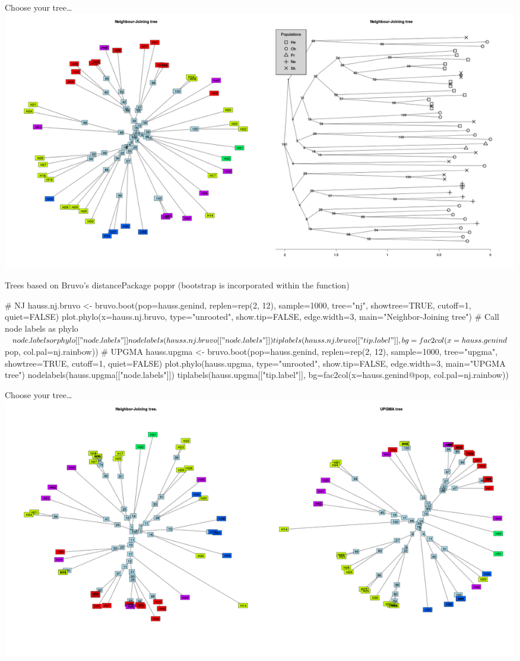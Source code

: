 \documentclass[compress, ucs, xelatex, 11pt, xcolor=svgnames,
  hyperref={
    bookmarks=true,
    unicode=true,
    colorlinks=true,
    pdftitle={Molecular data in R},
    plainpages=false,
    pdfauthor={Vojtech Zeisek},
    pdfsubject={Course about phylogeny and evolution in R},
    pdfcreator={XeLaTeX},
    pdfkeywords={R, evolution, phylogeny, molecular data},
    linkcolor=Tomato,
    anchorcolor=SaddleBrown,
    citecolor=Goldenrod,
    filecolor=DarkMagenta,
    menucolor=Sienna,
    urlcolor=DarkTurquoise,
    pdftex},
  url={hyphens, lowtilde} %
  ]{beamer}
\begin{document}
\begin{frame}{Choose your tree\ldots}
  \includegraphics[width=\textwidth]{nj2.png}
\end{frame}

\begin{frame}[fragile]{Trees based on Bruvo's distance}{Package poppr (bootstrap is incorporated within the function)}
  \begin{spluscode}
    # NJ
    hauss.nj.bruvo <- bruvo.boot(pop=hauss.genind, replen=rep(2, 12),
      sample=1000, tree="nj", showtree=TRUE, cutoff=1, quiet=FALSE)
    plot.phylo(x=hauss.nj.bruvo, type="unrooted", show.tip=FALSE,
      edge.width=3, main="Neighbor-Joining tree")
    # Call node labels as phylo$node.labels or phylo[["node.labels"]]
    nodelabels(hauss.nj.bruvo[["node.labels"]]) 
    tiplabels(hauss.nj.bruvo[["tip.label"]], bg=fac2col(x=hauss.genind$pop,
      col.pal=nj.rainbow))
    # UPGMA
    hauss.upgma <- bruvo.boot(pop=hauss.genind, replen=rep(2, 12),
      sample=1000, tree="upgma", showtree=TRUE, cutoff=1, quiet=FALSE)
    plot.phylo(hauss.upgma, type="unrooted", show.tip=FALSE, edge.width=3,
      main="UPGMA tree")
    nodelabels(hauss.upgma[["node.labels"]])
    tiplabels(hauss.upgma[["tip.label"]], bg=fac2col(x=hauss.genind@pop,
      col.pal=nj.rainbow))
  \end{spluscode}
\end{frame}

\begin{frame}{Choose your tree\ldots}
  \includegraphics[width=\textwidth]{nj-upgma-bruvo.png}
\end{frame}
\end{document}
